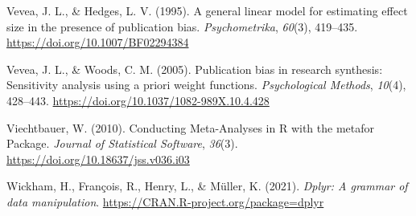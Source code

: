 \documentclass[
  bookmarksnumbered]{article}
\newlength{\cslhangindent}
\newlength{\cslentryspacingunit} %
\newenvironment{CSLReferences}[2] %
 {%
  \setlength{\parindent}{0pt}
  \ifodd #1
  \let\oldpar\par
  \def\par{\hangindent=\cslhangindent\oldpar}
  \fi
  \setlength{\parskip}{#2\cslentryspacingunit}
 }%
 {}
\begin{document}
\begin{CSLReferences}{1}{0}
\leavevmode{}%
Vevea, J. L., \& Hedges, L. V. (1995). A general linear model for estimating effect size in the presence of publication bias. \emph{Psychometrika}, \emph{60}(3), 419--435. \url{https://doi.org/10.1007/BF02294384}

\leavevmode{}%
Vevea, J. L., \& Woods, C. M. (2005). Publication bias in research synthesis: Sensitivity analysis using a priori weight functions. \emph{Psychological Methods}, \emph{10}(4), 428--443. \url{https://doi.org/10.1037/1082-989X.10.4.428}

\leavevmode{}%
Viechtbauer, W. (2010). Conducting Meta-Analyses in {R} with the metafor Package. \emph{Journal of Statistical Software}, \emph{36}(3). \url{https://doi.org/10.18637/jss.v036.i03}

\leavevmode{}%
Wickham, H., François, R., Henry, L., \& Müller, K. (2021). \emph{Dplyr: A grammar of data manipulation}. \url{https://CRAN.R-project.org/package=dplyr}

\end{CSLReferences}
\end{document}
